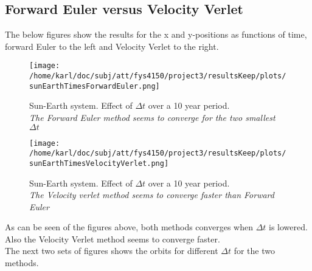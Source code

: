 \documentclass{article}
\begin{document}
\subsection{Forward Euler versus Velocity Verlet}
The below figures show the results for the x and y-positions as functions of time, forward Euler to the left and Velocity Verlet to the right. 


\begin{minipage}{.49\textwidth} 
	\begin{figure}[H]
		\centering
		\texttt{[image: /home/karl/doc/subj/att/fys4150/project3/resultsKeep/plots/sunEarthTimesForwardEuler.png]}
		\caption{Sun-Earth system. Effect of $\Delta t$ over a 10 year period. \\ \textit{The Forward Euler method seems to converge for the two smallest $\Delta t$}}
		\label{1}
	\end{figure}
\end{minipage}\hfill
\begin{minipage}{.49\textwidth} 
	\begin{figure}[H]
		\centering
		\texttt{[image: /home/karl/doc/subj/att/fys4150/project3/resultsKeep/plots/sunEarthTimesVelocityVerlet.png]}
		\caption{Sun-Earth system. Effect of $\Delta t$ over a 10 year period. \\ \textit{The Velocity verlet method seems to converge faster than Forward Euler}}
		\label{1}
	\end{figure}
\end{minipage}\hfill
\vspace{2ex}

As can be seen of the figures above, both methods converges when $\Delta t$ is lowered.  Also the Velocity Verlet method seems to converge faster.\\

The next two sets of figures shows the orbits for different $\Delta t$ for the two methods.
\end{document}
